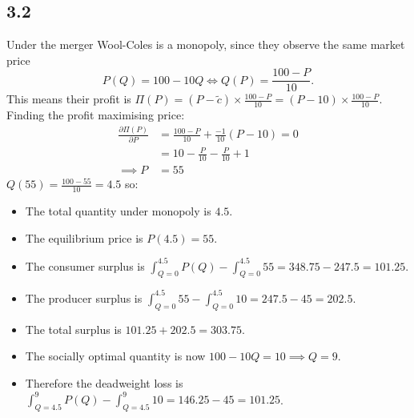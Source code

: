 \documentclass{article}
\begin{document}
\subsection*{3.2}
Under the merger Wool-Coles is a monopoly, since they observe the same market price $$P(Q) = 100 - 10Q \iff Q(P) = \frac{100 - P}{10}.$$
This means their profit is $\Pi(P) = (P - \tilde{c}) \times \frac{100 - P}{10} = (P - 10) \times \frac{100 - P}{10}$. Finding the profit maximising price:
\begin{align*}
    \frac{\partial \Pi(P)}{\partial P} &= \frac{100 - P}{10} + \frac{-1}{10} (P - 10) = 0\\
    &= 10 - \frac{P}{10} - \frac{P}{10} + 1\\
    \implies P &= 55
\end{align*}
$Q(55) = \frac{100 - 55}{10} = 4.5$ so:
\begin{itemize}
    \item The total quantity under monopoly is $4.5$.
    \item The equilibrium price is $P(4.5) = 55$.
    \item The consumer surplus is $\int_{Q=0}^{4.5} P(Q) - \int_{Q=0}^{4.5} 55 = 348.75 - 247.5 = 101.25$.
    \item The producer surplus is $\int_{Q=0}^{4.5} 55 - \int_{Q=0}^{4.5} 10 = 247.5 - 45 = 202.5$.
    \item The total surplus is $101.25 + 202.5 = 303.75$.
    \item The socially optimal quantity is now $100-10Q = 10 \implies Q = 9$.
    \item Therefore the deadweight loss is $\int_{Q=4.5}^{9} P(Q) - \int_{Q=4.5}^{9} 10 = 146.25 - 45 = 101.25$.
\end{itemize}
\end{document}
